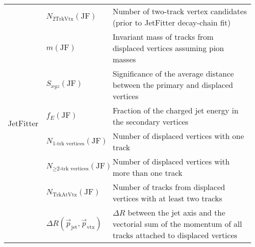 \begin{table}[!htb]
\begin{scriptsize}
\begin{center}
\begin{tabularx}{\textwidth}{|X|l|X|}
    \hline
    \multirow{8}{*}{JetFitter} & $N_{\text{2TrkVtx}}(\text{JF})$ & Number of two-track vertex candidates (prior to JetFitter decay-chain fit) \\
    \cline{2-3}
            & $m(\text{JF})$ & Invariant mass of tracks from displaced vertices assuming pion masses \\
    \cline{2-3}
            & $S_{xyz}(\text{JF})$ & Significance of the average distance between the primary and displaced vertices \\
    \cline{2-3}
            & $f_E(\text{JF})$ & Fraction of the charged jet energy in the secondary vertices \\
    \cline{2-3}
            & $N_{\text{1-trk vertices}}(\text{JF})$ & Number of displaced vertices with one track \\
    \cline{2-3}
            & $N_{\ge\text{2-trk vertices}}(\text{JF})$ & Number of displaced vertices with more than one track \\
    \cline{2-3}
            & $N_{\text{TrkAtVtx}}(\text{JF})$ & Number of tracks from displaced vertices with at least two tracks \\
    \cline{2-3}
            & $\Delta R(\vec{p}_{\text{jet}}, \vec{p}_{\text{vtx}})$ & $\Delta R$ between the jet axis and the vectorial sum of the momentum of all tracks attached to displaced vertices \\
    \hline
    \hline
    \end{tabularx}
    \end{center}
    \end{scriptsize}
\end{table}
